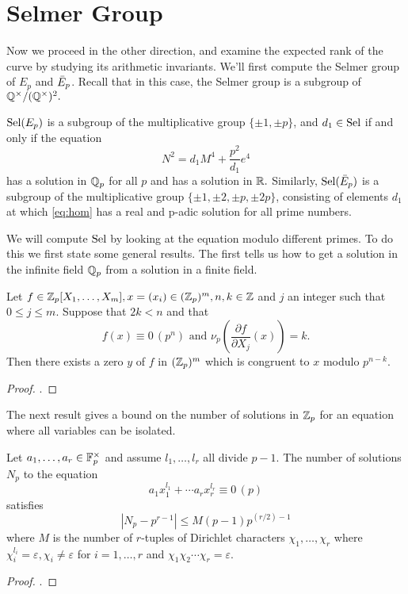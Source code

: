 \documentclass[12pt, a4paper]{report}
\begin{document}
\section{Selmer Group}

Now we proceed in the other direction, and examine the expected rank of the
curve by studying its arithmetic invariants. We'll first compute the Selmer
group of $E_p$ and $\bar{E}_p$. Recall that in this case, the Selmer group is a
subgroup of ${\mathbb Q}^\times / ({\mathbb Q}^\times)^2.$

\begin{prop}
  $\text{\normalfont Sel}(E_p)$ is a subgroup of the multiplicative group
  $ \{ \pm 1, \pm p \}$, and $d_1 \in \text{\normalfont Sel}$ if and only if the equation
  \begin{equation} \label{eq:hom}
    N^2 = d_1 M^4 + \frac{p^2}{d_1}e^4
  \end{equation}
  has a solution in ${\mathbb Q}_p$ for all $p$ and has a solution in ${\mathbb R}.$
  Similarly, $\text{\normalfont Sel}(\bar{E}_p)$ is a subgroup of the multiplicative group
  $\{\pm 1, \pm 2, \pm p, \pm 2p\}$,
  consisting of elements $d_1$ at which \autoref{eq:hom} has a real and p-adic
  solution for all prime numbers.
\end{prop}

We will compute $\text{\normalfont Sel}$ by looking at the equation modulo different primes.
To do this we first state some general results. The first tells us
how to get a solution in the infinite field ${\mathbb Q}_p$ from a solution in a finite
field.

\begin{prop}
  Let $f \in {\mathbb Z}_p[X_1,\dots,X_m], x = (x_i) \in ({\mathbb Z}_p)^m, n, k \in {\mathbb Z}$ and
  $j$ an integer such that $0 \leq j \leq m$. Suppose that $2k < n$ and that
  \[ f(x) \equiv 0 \, (p^n) \text { and } \nu_p
    \left(\frac{\partial f}{\partial X_j} (x) \right) = k.\]
  Then there exists a zero $y$ of $f$ in $({\mathbb Z}_p)^m$ which is congruent to $x$
  modulo $p^{n-k}$.
\end{prop}
\begin{proof}
  \cite[See][Chapter 2-2, page 14]{Serre}.
\end{proof}

The next result gives a bound on the number of solutions in ${\mathbb Z}_p$ for an equation
where all variables can be isolated.

\begin{prop} \label{prop:countsols}
  Let $a_1, \dots, a_r \in \mathbb{F}_p^\times$ and assume $l_1, \dots, l_r$ all divide
  $p-1$.
  The number of solutions $N_p$ to the equation
  \[a_1x_1^{l_1} + \cdots a_rx_r^{l_r} \equiv 0 \, (p)\]
  satisfies
  \begin{equation} 
    |N_p - p^{r-1}| \leq M(p-1)p^{(r/2)-1}
  \end{equation} 
  where $M$ is the number of $r$-tuples
  of Dirichlet characters
  $\chi_1, \dots , \chi_r$
  where $\chi_i^{l_i} = \varepsilon, \chi_i \neq \varepsilon$ for
  $i = 1, \dots, r$ and $\chi_1 \chi_2 \cdots \chi_r = \varepsilon$.
\end{prop} 
\begin{proof}
  \cite[See][Chapter 8-7, page 103]{classical}.
\end{proof}
\end{document}
